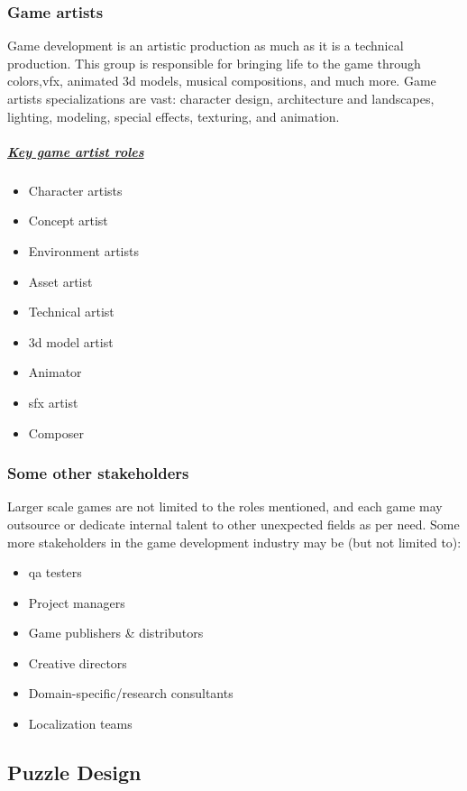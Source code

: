 \documentclass[../main.tex]{subfiles}
\begin{document}
\subsubsection{Game artists}
Game development is an artistic production as much as it is a technical production. This group is responsible for bringing life to the game through colors,\acrfull{vfx}, animated \acrshort{3d} models, musical compositions, and much more. Game artists specializations are vast: character design, architecture and landscapes, lighting, modeling, special effects, texturing, and animation.
\subparagraph*{\underline{Key game artist roles}}
\begin{itemize}
    \item Character artists
    \item Concept artist
    \item Environment artists
    \item Asset artist
    \item Technical artist
    \item \acrshort{3d} model artist
    \item Animator
    \item \acrfull{sfx} artist
    \item Composer
\end{itemize}


\subsubsection{Some other stakeholders}
Larger scale games are not limited to the roles mentioned, and each game may outsource or dedicate internal talent to other unexpected fields as per need. Some more stakeholders in the game development industry may be (but not limited to):
\begin{itemize}
    \item \acrfull{qa} testers
    \item Project managers
    \item Game publishers \& distributors
    \item Creative directors
    \item Domain-specific/research consultants
    \item Localization teams
\end{itemize}

\subsection{Puzzle Design}
\end{document}
